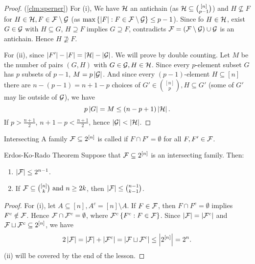 \begin{proof}(\cref{clm:sperner})
    For (i), We have $\mathcal{H}$ an antichain (as $\mathcal{H}\subseteq {[n]\choose p-1}$) and $H\not\subseteq F$ for $H\in \mathcal{H}, F\in \mathcal{F}\setminus \mathcal{G}$ (as $\max\left\{\left|F\right|:F\in \mathcal{F}\setminus \mathcal{G}\right\}\leq p-1$). Since fo $H\in \mathcal{H}$, exist $G\in \mathcal{G}$ with $H\subseteq G$, $H\supseteq F$ implies $G\supseteq F$, contradicts $\mathcal{F}=(\mathcal{F}\setminus \mathcal{G})\cup \mathcal{G}$ is an antichain. Hence $H\not\supseteq F$.

    For (ii), since $\left|F'\right|-\left|F\right|=\left|\mathcal{H}\right|-\left|\mathcal{G}\right|$. We will prove by double counting. Let $M$ be the number of pairs $(G,H)$ with $G\in \mathcal{G}, H\in \mathcal{H}$. Since every $p$-element subset $G$ has $p$ subsets of $p-1$, $M=p\left|\mathcal{G}\right|$. And since every $(p-1)$-element $H\subseteq [n]$ there are $n-(p-1)=n+1-p$ choices of $G'\in {[n]\choose p}, H\subseteq G'$ (some of $G'$ may lie outside of $\mathcal{G}$), we have
    \[p\left|G\right|=M\leq (n-p+1)\left|\mathcal{H}\right|.\]
    If $p>\frac{n+1}{2}$, $n+1-p<\frac{n+1}{2}$, hence $\left|\mathcal{G}\right|<\left|\mathcal{H}\right|$.
\end{proof}

\begin{definition}[def:]{Intersecting}
    A family $\mathcal{F}\subseteq 2^{[n]}$ is called  if $F\cap F'=\emptyset $ for all $F,F'\in \mathcal{F}$.
\end{definition}

\begin{theorem}[thm:]{Erdos-Ko-Rado Theorem}
    Suppose that $\mathcal{F}\subseteq 2^{[n]}$ is an intersecting family. Then:
    \begin{enumerate}
        \item $\left|\mathcal{F}\right|\leq 2^{n-1}$.
        \item If $\mathcal{F}\subseteq {[n]\choose k}\textnormal{ and }n\geq 2k$, then $\left|\mathcal{F}\right|\leq {n-1\choose k-1}$.
    \end{enumerate}
\end{theorem}

\begin{proof}
    For (i), let $A\subseteq [n], A^c=[n]\setminus A$. If $F\in \mathcal{F}$, then $F\cap F^c=\emptyset $ implies $F^c\notin \mathcal{F}$. Hence $\mathcal{F}\cap \mathcal{F}^c=\emptyset $, where $\mathcal{F}^c\left\{F^c:F\in \mathcal{F}\right\}$. Since $\left|\mathcal{F}\right|=\left|\mathcal{F}^c\right|$ and $\mathcal{F}\sqcup\mathcal{F}^c\subseteq 2^{[n]}$, we have
    \[2\left|\mathcal{F}\right|=\left|\mathcal{F}\right|+\left|\mathcal{F}^c\right|=\left|\mathcal{F}\sqcup\mathcal{F}^c\right|\leq \left|2^{[n]}\right|=2^n.\]
    (ii) will be covered by the end of the lesson.
\end{proof}

